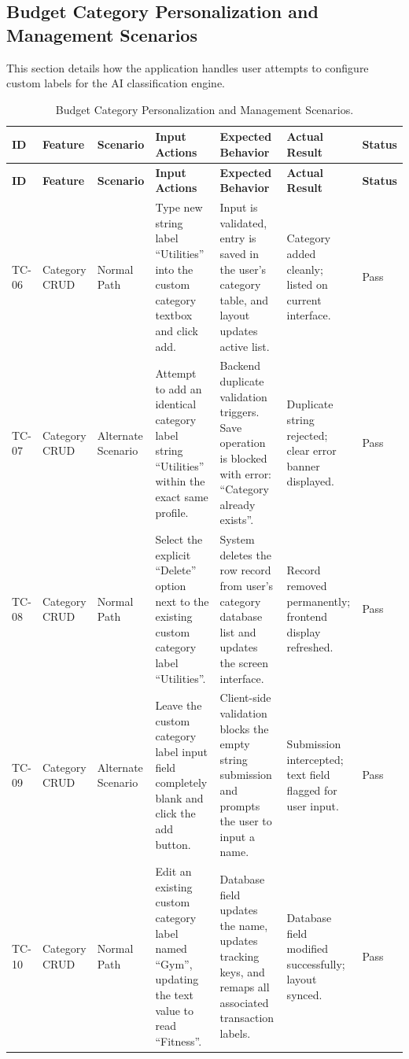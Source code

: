 \subsection{Budget Category Personalization and Management Scenarios}
This section details how the application handles user attempts to configure custom labels for the AI classification engine.

\begingroup
\setlength{\tabcolsep}{3pt}
\renewcommand{\arraystretch}{1.3}
\begin{longtable}{|p{0.9cm}|>{\raggedright\arraybackslash}p{1.7cm}|>{\raggedright\arraybackslash}p{1.5cm}|>{\raggedright\arraybackslash}p{3.3cm}|>{\raggedright\arraybackslash}p{3.3cm}|>{\raggedright\arraybackslash}p{1.9cm}|>{\raggedright\arraybackslash}p{1.2cm}|}
	\caption{Budget Category Personalization and Management Scenarios.}
	\label{tab:tc_categories}\\
	\hline
	\textbf{ID} & \textbf{Feature} & \textbf{Scenario} & \textbf{Input Actions} & \textbf{Expected Behavior} & \textbf{Actual Result} & \textbf{Status} \\ \hline
	\endfirsthead
	\hline
	\textbf{ID} & \textbf{Feature} & \textbf{Scenario} & \textbf{Input Actions} & \textbf{Expected Behavior} & \textbf{Actual Result} & \textbf{Status} \\ \hline
	\endhead
	TC-06 & Category CRUD & Normal Path & Type new string label ``Utilities'' into the custom category textbox and click add. & Input is validated, entry is saved in the user's category table, and layout updates active list. & Category added cleanly; listed on current interface. & Pass \\ \hline
	TC-07 & Category CRUD & Alternate Scenario & Attempt to add an identical category label string ``Utilities'' within the exact same profile. & Backend duplicate validation triggers. Save operation is blocked with error: ``Category already exists''. & Duplicate string rejected; clear error banner displayed. & Pass \\ \hline
	TC-08 & Category CRUD & Normal Path & Select the explicit ``Delete'' option next to the existing custom category label ``Utilities''. & System deletes the row record from user's category database list and updates the screen interface. & Record removed permanently; frontend display refreshed. & Pass \\ \hline
	TC-09 & Category CRUD & Alternate Scenario & Leave the custom category label input field completely blank and click the add button. & Client-side validation blocks the empty string submission and prompts the user to input a name. & Submission intercepted; text field flagged for user input. & Pass \\ \hline
	TC-10 & Category CRUD & Normal Path & Edit an existing custom category label named ``Gym'', updating the text value to read ``Fitness''. & Database field updates the name, updates tracking keys, and remaps all associated transaction labels. & Database field modified successfully; layout synced. & Pass \\ \hline
\end{longtable}
\endgroup


